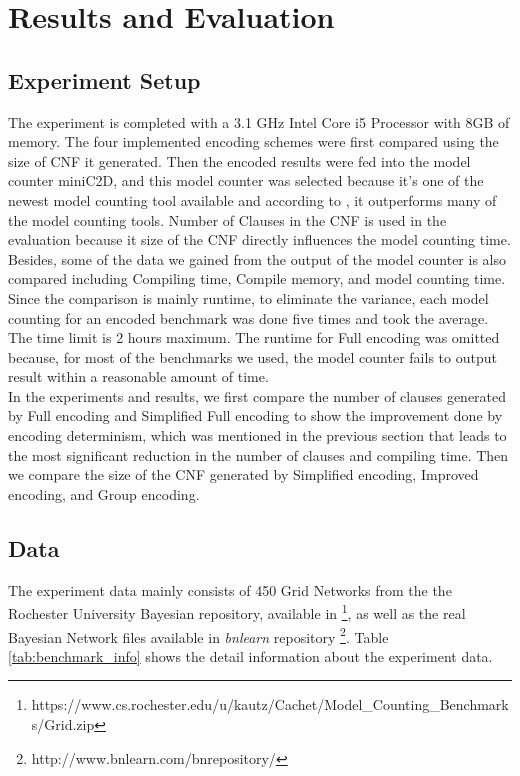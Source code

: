 \newpage
\section{Results and Evaluation}
\subsection{Experiment Setup}
The experiment is completed with a 3.1 GHz Intel Core i5 Processor with 8GB of memory. The four implemented encoding schemes were first compared using the size of CNF it generated. Then the encoded results were fed into the model counter miniC2D, and this model counter was selected because it's one of the newest model counting tool available and according to \cite{minic2d}, it outperforms many of the model counting tools. Number of Clauses in the CNF is used in the evaluation because it size of the CNF directly influences the model counting time. Besides, some of the data we gained from the output of the model counter is also compared including Compiling time, Compile memory, and model counting time.\\

\noindent Since the comparison is mainly runtime, to eliminate the variance, each model counting for an encoded benchmark was done five times and took the average. The time limit is 2 hours maximum. The runtime for Full encoding was omitted because, for most of the benchmarks we used, the model counter fails to output result within a reasonable amount of time.\\

\noindent In the experiments and results, we first compare the number of clauses generated by Full encoding and Simplified Full encoding to show the improvement done by encoding determinism, which was mentioned in the previous section that leads to the most significant reduction in the number of clauses and compiling time. Then we compare the size of the CNF generated by Simplified encoding, Improved encoding, and Group encoding.

\subsection{Data}
The experiment data mainly consists of 450 Grid Networks from the the Rochester University Bayesian repository, available in 
\footnote{https://www.cs.rochester.edu/u/kautz/Cachet/Model\_Counting\_Benchmarks/Grid.zip}, as well as the real Bayesian Network files available in \textit{bnlearn} repository \footnote{http://www.bnlearn.com/bnrepository/}. Table \ref{tab:benchmark_info} shows the detail information about the experiment data.\\

